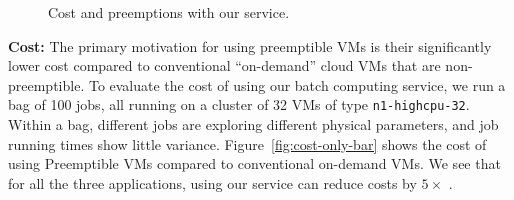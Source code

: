 





\begin{figure}[t]
  \vspace*{\myfigspace}
  \centering
\hfill
{}
\label{fig:service-all}
\vspace*{-0.4cm}
\caption{Cost and preemptions with our service.}
\vspace*{\myfigspace}
\end{figure}  



\noindent \textbf{Cost:}
The primary motivation for using preemptible VMs is their significantly lower cost compared to conventional ``on-demand'' cloud VMs that are non-preemptible.
To evaluate the cost of using our batch computing service, we run a bag of 100 jobs, all running on a cluster of 32 VMs of type \texttt{n1-highcpu-32}. 
Within a bag, different jobs are exploring different physical parameters, and job running times show little variance. 
Figure~\ref{fig:cost-only-bar} shows the cost of using Preemptible VMs compared to conventional on-demand VMs.
We see that for all the three applications, using our service can reduce costs by $5\times$ .

